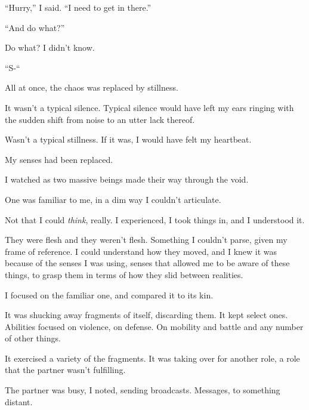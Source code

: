 ``Hurry,'' I said.  ``I need to get in there.''



``And do what?''



Do what?  I didn't know.



``S-``



All at once, the chaos was replaced by stillness.



It wasn't a typical silence.  Typical silence would have left my ears ringing with the sudden shift from noise to an utter lack thereof.



Wasn't a typical stillness.  If it was, I would have felt my heartbeat.



My senses had been replaced.



I watched as two massive beings made their way through the void.



One was familiar to me, in a dim way I couldn't articulate.



Not that I could \emph{think}, really.  I experienced, I took things in, and I understood it.



They were flesh and they weren't flesh.  Something I couldn't parse, given my frame of reference.  I could understand how they moved, and I knew it was because of the senses I was using, senses that allowed me to be aware of these things, to grasp them in terms of how they slid between realities.



I focused on the familiar one, and compared it to its kin.



It was shucking away fragments of itself, discarding them.  It kept select ones.  Abilities focused on violence, on defense.  On mobility and battle and any number of other things.



It exercised a variety of the fragments.  It was taking over for another role, a role that the partner wasn't fulfilling.



The partner was busy, I noted, sending broadcasts.  Messages, to something distant.



